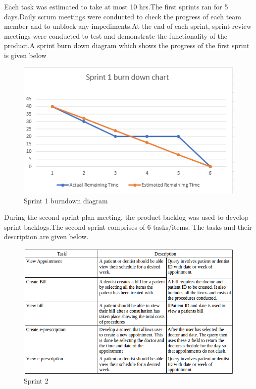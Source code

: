 \documentclass[11 pt]{article}
\begin{document}
\newpage
Each task was estimated to take at most 10 hrs.The first sprints ran for 5 days.Daily scrum meetings were conducted to check the progress of each team member and to unblock any impediments.At the end of each sprint, sprint review meetings were conducted to test and demonstrate the functionality of the product.A sprint burn down diagram which shows the progress of the first sprint is given below
\begin{figure}[h]
\centering
\includegraphics[width=\linewidth]{sprint1.PNG}
\caption{Sprint 1 burndown diagram}
\label{fig:ERD}
\end{figure}
\newpage
During the second sprint plan meeting, the product backlog was used to develop sprint backlogs.The second sprint comprises of 6 tasks/items. The tasks and their description are given below.

\newpage
\begin{figure}[h]
\centering
\includegraphics[width=\linewidth]{sprint2.png}
\caption{Sprint 2}
\label{fig:ERD}
\end{figure}
\end{document}
